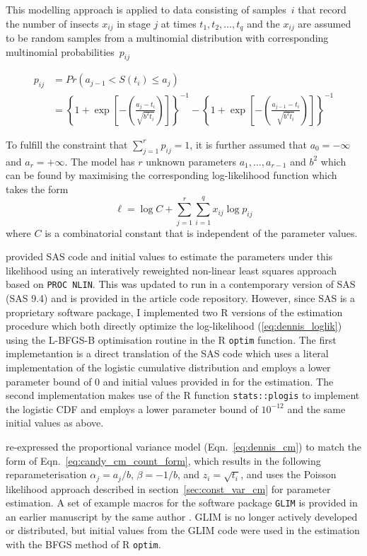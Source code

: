 This modelling approach is applied to data consisting of samples~$i$ that record the number of insects $x_{ij}$ in stage $j$ at times $t_1, t_2, \dots, t_q$ and the $x_{ij}$ are assumed to be random samples from a multinomial distribution with corresponding multinomial probabilities~$p_{ij}$

\begin{align}
p_{ij} & = Pr(a_{j-1} < S(t_i) \leq a_{j})\\
& =  \left\{ 1 + \exp\left[-\left(\frac{a_j-t_i}{\sqrt{b^2t_i}}\right)\right]\right\}^{-1} - \left\{ 1 + \exp\left[-\left(\frac{a_{j-1}-t_i}{\sqrt{b^2t_i}}\right)\right]\right\}^{-1}\label{eq:dennis_cm}
\end{align}

To fulfill the constraint that $\sum_{j=1}^r p_{ij}= 1$, it is further assumed that $a_0 = -\infty$ and $a_r = +\infty$.
The model has $r$ unknown parameters $a_1, \dots, a_{r-1}$ and $b^2$ which can be found by maximising the corresponding log-likelihood function which takes the form 
\begin{equation}
\mathcal{\ell} = \log C + \sum_{j=1}^r \sum_{i=1}^q x_{ij} \log p_{ij}
\label{eq:dennis_loglik}
\end{equation}
where $C$ is a combinatorial constant that is independent of the parameter values.

\citet{dennis1986stochastic} provided SAS code and initial values to estimate the parameters under this likelihood using an interatively reweighted non-linear least squares approach based on \verb+PROC NLIN+. 
This was updated to run in a contemporary version of SAS (SAS 9.4) and is provided in the article code repository. 
However, since SAS is a proprietary software package, I implemented two R versions of the estimation procedure which both directly optimize the log-likelihood (\ref{eq:dennis_loglik}) using the L-BFGS-B optimisation routine \citep{byrd1995limited} in the R \verb+optim+ function. The first implemetantion is a direct translation of the SAS code which uses a literal implementation of the logistic cumulative distribution and employs a lower parameter bound of 0 and initial values provided in \citep{dennis1986stochastic} for the estimation. The second implementation makes use of the R function \verb+stats::plogis+ to implement the logistic CDF  and employs a lower parameter bound of $10^{-12}$ and the same initial values as above.

\citet{candy1991modeling} re-expressed the proportional variance model (Eqn.~\ref{eq:dennis_cm}) to match the form of Eqn.~\ref{eq:candy_cm_count_form}, which results in the following re\-para\-meter\-isation $\alpha_j = a_j/b$, $\beta = -1/b$, and $z_i = \sqrt{t_i}$, and uses the Poisson likelihood approach described in section~\ref{sec:const_var_cm} for parameter estimation. 
A set of example macros for the software package \verb+GLIM+ \citep{aitkin1989statistical} is provided in an earlier manuscript by the same author \citep{candy1990biology}. GLIM is no longer actively developed or distributed, but initial values from the GLIM code were used in the estimation with the BFGS method of R \verb+optim+.

